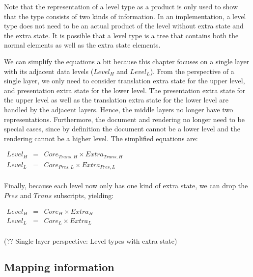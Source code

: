 Note that the representation of a level type as a product is only used to show that the type consists of two kinds of information. In an implementation, a level type does not need to be an actual product of the level without extra state and the extra state. It is possible that a level type is a tree that contains both the normal elements as well as the extra state elements.

We can simplify the equations a bit because this chapter focuses on a single layer with its adjacent data levels ($Level_{H}$ and $Level_{L}$). From the perspective of a single layer, we only need to consider translation extra state for the upper level, and presentation extra state for the lower level. The presentation extra state for the upper level as well as the translation extra state for the lower level are handled by the adjacent layers. Hence, the middle layers no longer have two representations. Furthermore, the document and rendering no longer need to be special cases, since by definition the document cannot be a lower level and the rendering cannot be a higher level. The simplified equations are:

\begin{small}\( \begin{array}{lcll}
Level_{H} & = & Core_{Trans, H} \times Extra_{Trans, H}\\
Level_{L} & = & Core_{Pres, L} \times Extra_{Pres, L}\\
\end{array}\)\end{small}

Finally, because each level now only has one kind of extra state, we can drop the $Pres$ and $Trans$ subscripts, yielding:

\begin{small}\( \begin{array}{lcll}
Level_{H} & = & Core_{H} \times Extra_{H}\\
Level_{L} & = & Core_{L} \times Extra_{L}\\
\end{array}\)\end{small}
\begin{center}(?? Single layer perspective: Level types with extra state) \end{center}\vspace{1em}


%																
\subsection{Mapping information} \label{sect:mappingInformation}


